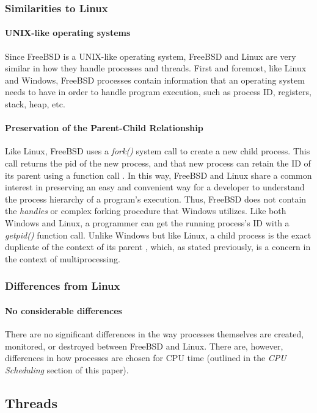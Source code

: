 \documentclass[letterpaper,10pt,titlepage]{article}
\begin{document}
\subsubsection{Similarities to Linux}
\paragraph{UNIX-like operating systems}
Since FreeBSD is a UNIX-like operating system, FreeBSD and Linux are very similar in how they handle processes and threads. First and foremost, like Linux and Windows, FreeBSD processes contain information that an operating system needs to have in order to handle program execution, such as process ID, registers, stack, heap, etc. 
\paragraph{Preservation of the Parent-Child Relationship} 
Like Linux, FreeBSD uses a \emph{fork()} system call to create a new child process. This call returns the pid of the new process, and that new process can retain the ID of its parent using a function call \cite{mck15}. In this way, FreeBSD and Linux share a common interest in preserving an easy and convenient way for a developer to understand the process hierarchy of a program's execution. Thus, FreeBSD does not contain the \emph{handles} or complex forking procedure that Windows utilizes. Like both Windows and Linux, a programmer can get the running process's ID with a \emph{getpid()} function call. Unlike Windows but like Linux, a child process is the exact duplicate of the context of its parent \cite{mck15}, which, as stated previously, is a concern in the context of multiprocessing.
\subsubsection{Differences from Linux}
\paragraph{No considerable differences} There are no significant differences in the way processes themselves are created, monitored, or destroyed between FreeBSD and Linux. There are, however, differences in how processes are chosen for CPU time (outlined in the \emph{CPU Scheduling} section of this paper).
\subsection{Threads}
\end{document}
